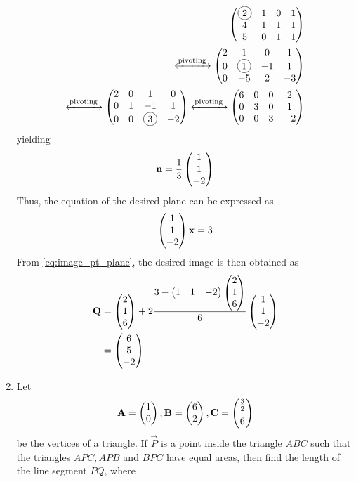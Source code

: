 \documentclass[journal,12pt,twocolumn]{IEEEtran}
\renewcommand\thesection{\arabic{section}}
\begin{document}
\begin{enumerate}[label=\thesection.\arabic*.,ref=\thesection.\theenumi]
\begin{align}
	\myvec{\circled{2} &  1 & 0  & 1 \\ 4 &  1 & 1 & 1\\ 5 &  0 & 1 & 1}
	\\
	\xleftrightarrow[]{	\text{pivoting }}
	\myvec{2 &  1 & 0  & 1 \\ 0 &  \circled{1} & -1 & 1\\ 0 &  -5 & 2 & -3}
	\\
	\xleftrightarrow[]{	\text{pivoting }}
	\myvec{2 &  0 & 1  & 0 \\ 0 &  {1} & -1 & 1\\ 0 &  0 & \circled{3} & -2}
	\xleftrightarrow[]{	\text{pivoting }}
	\myvec{6 &  0 & 0  & 2 \\ 0 &  3 & 0 & 1\\ 0 &  0 & {3} & -2}
\end{align}
yielding
\begin{align}
	\mathbf{n} = \frac{1}{3}\begin{pmatrix}1 \\ 1 \\ -2\end{pmatrix}
\end{align}
Thus, the equation of the desired plane can be expressed as 
\begin{align}
	\begin{pmatrix}1 \\ 1 \\ -2\end{pmatrix} \mathbf{x} = 3
\end{align}
			From \eqref{eq:image_pt_plane}, the desired image is then obtained as 
\begin{align}
	\mathbf{Q} &=
	\begin{pmatrix}2 \\  1 \\ 6 \end{pmatrix}   + 2\frac{3 - \begin{pmatrix}1 & 1 & -2\end{pmatrix}\begin{pmatrix}2 \\  1 \\ 6 \end{pmatrix}}{6}\begin{pmatrix}1 \\ 1 \\ -2\end{pmatrix}
	\\
	&=  \begin{pmatrix}6 \\ 5 \\ -2\end{pmatrix}
		\end{align}
\item Let 
\begin{align}
	\mathbf{A} = 	\begin{pmatrix}1\\   0\end{pmatrix}, 
	\mathbf{B} = 	\begin{pmatrix}6\\ 2 \end{pmatrix},
	\mathbf{C} = 	\begin{pmatrix}\frac{3}{2}\\[0.5em] 6\end{pmatrix}
\end{align}
be the vertices of a triangle.  If $\vec{P}$ is a point inside the triangle $ABC$ such that the triangles $APC,APB$ and $BPC$ have equal areas, then find the length of the line segment $PQ$, where  

\end{enumerate}
\end{document}
